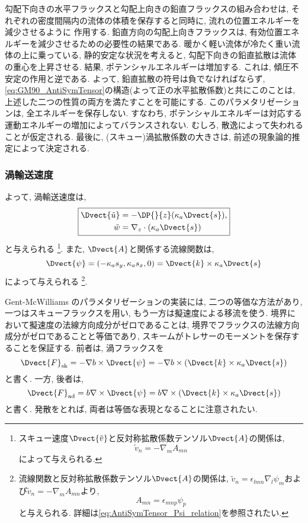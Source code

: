 勾配下向きの水平フラックスと勾配上向きの鉛直フラックスの組み合わせは, 
それぞれの密度間隔内の流体の体積を保存すると同時に, 流れの位置エネルギーを減少させるように
作用する. 
鉛直方向の勾配上向きフラックスは, 有効位置エネルギーを減少させるための必要性の結果である. 
暖かく軽い流体が冷たく重い流体の上に乗っている, 静的安定な状況を考えると, 
勾配下向きの鉛直拡散は流体の重心を上昇させる. 結果, ポテンシャルエネルギーは増加する. 
これは, 傾圧不安定の作用と逆である. 
よって, 鉛直拡散の符号は負でなければならず, 
\eqref{eq:GM90_AntiSymTensor}の構造(よって正の水平拡散係数)と共にこのことは, 
上述した二つの性質の両方を満たすことを可能にする. 
このパラメタリゼーションは, 全エネルギーを保存しない. 
すなわち, ポテンシャルエネルギーは対応する運動エネルギーの増加によってバランスされない. 
むしろ, 散逸によって失われることが仮定される. 
最後に, (スキュー)渦拡散係数の大きさは, 前述の現象論的推定によって決定される.

\subsubsection*{渦輸送速度}
よって, 渦輸送速度は,
\begin{equation}
 \boxed{
   \begin{split}
   \Dvect{\tilde{u}} &= - \DP{}{z} (\kappa_a \Dvect{s}), \\
    \tilde{w} &= \nabla_z \cdot (\kappa_a \Dvect{s})
   \end{split}
   }
   \label{eq:GM_eddyInduceVel}
\end{equation}
と与えられる%
\footnote{
スキュー速度$\Dvect{\tilde{v}}$と反対称拡散係数テンソル$\Dvect{A}$の関係は, 
\begin{equation*}
  \tilde{v}_n = - \nabla_m A_{mn}
\end{equation*}
によって与えられる. 
}. 
また, $\Dvect{A}$と関係する流線関数は, 
\begin{equation}
  \Dvect{\psi} = (-\kappa_a s_y, \kappa_a s_x, 0) = \Dvect{k} \times \kappa_a \Dvect{s}
\end{equation}
によって与えられる%
\footnote{
流線関数と反対称拡散係数テンソル$\Dvect{A}$の関係は, 
$\tilde{v}_n = \epsilon_{lmn}\nabla_l \psi_m$および$\tilde{v}_n = - \nabla_m A_{mn}$より, 
$$
A_{mn} = \epsilon_{mnp} \psi_p
$$
と与えられる. 詳細は\eqref{eq:AntiSymTensor_Psi_relation}を参照されたい. 
}. 

Gent-McWilliams のパラメタリゼーションの実装には, 二つの等価な方法があり, 
一つはスキューフラックスを用い, もう一方は擬速度による移流を使う. 
境界において擬速度の法線方向成分がゼロであることは, 境界でフラックスの法線方向成分がゼロであることと等価であり,
スキームがトレサーのモーメントを保存することを保証する. 
前者は, 渦フラックスを
\begin{equation}
 \Dvect{F}_{\rm sk}
  = - \nabla b \times \Dvect{\psi}
  = - \nabla b \times (\Dvect{k} \times \kappa_a \Dvect{s}) 
\end{equation}
と書く. 
一方, 後者は, 
\begin{equation}
 \Dvect{F}_{\rm ad}
  = b \nabla \times \Dvect{\psi}
  = b \nabla \times (\Dvect{k} \times \kappa_a \Dvect{s}) 
\end{equation}
と書く. 
発散をとれば, 両者は等価な表現となることに注意されたい. 

